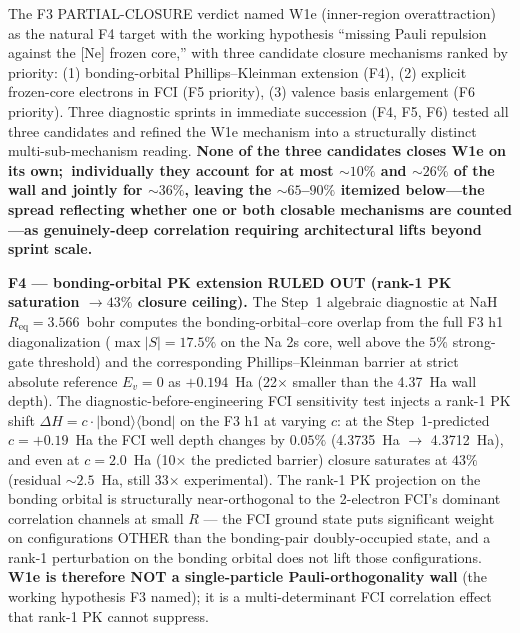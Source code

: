 \documentclass[aps,pra,twocolumn,superscriptaddress,longbibliography]{revtex4-2}
\begin{document}
The F3 PARTIAL-CLOSURE verdict named W1e (inner-region overattraction)
as the natural F4 target with the working hypothesis ``missing
Pauli repulsion against the [Ne] frozen core,'' with three candidate
closure mechanisms ranked by priority: (1) bonding-orbital
Phillips--Kleinman extension (F4), (2) explicit frozen-core electrons
in FCI (F5 priority), (3) valence basis enlargement (F6 priority).
Three diagnostic sprints in immediate succession (F4, F5, F6) tested all three
candidates and refined the W1e mechanism into a structurally distinct
multi-sub-mechanism reading. \textbf{None of the three candidates
closes W1e on its own;\ individually they account for at most
${\sim}10\%$ and ${\sim}26\%$ of the wall and jointly for ${\sim}36\%$, leaving the
${\sim}65$--$90\%$ itemized below---the spread reflecting whether one or both
closable mechanisms are counted---as
genuinely-deep correlation requiring architectural lifts beyond
sprint scale.}

\textbf{F4 --- bonding-orbital PK extension RULED OUT
(rank-1 PK saturation $\to 43\%$ closure ceiling).} The Step~1
algebraic diagnostic at NaH $R_\text{eq}=3.566$~bohr computes the
bonding-orbital--core overlap from the full F3 h1 diagonalization
($\max |S| = 17.5\%$ on the Na 2s core, well above the $5\%$
strong-gate threshold) and the corresponding Phillips--Kleinman
barrier at strict absolute reference $E_v = 0$ as $+0.194$~Ha
(22$\times$ smaller than the 4.37~Ha wall depth). The
diagnostic-before-engineering FCI sensitivity test injects a
rank-1 PK shift $\Delta H = c \cdot |\text{bond}\rangle\langle
\text{bond}|$ on the F3 h1 at varying $c$: at the Step~1-predicted
$c = +0.19$~Ha the FCI well depth changes by $0.05\%$
(4.3735~Ha $\to$ 4.3712~Ha), and even at $c = 2.0$~Ha (10$\times$
the predicted barrier) closure saturates at $43\%$ (residual
${\sim}2.5$~Ha, still 33$\times$ experimental). The rank-1
PK projection on the bonding orbital is structurally near-orthogonal
to the 2-electron FCI's dominant correlation channels at small $R$
--- the FCI ground state puts significant weight on configurations
OTHER than the bonding-pair doubly-occupied state, and a
rank-1 perturbation on the bonding orbital does not lift those
configurations. \textbf{W1e is therefore NOT a single-particle
Pauli-orthogonality wall} (the working hypothesis F3 named); it is
a multi-determinant FCI correlation effect that rank-1 PK cannot
suppress.
\end{document}
